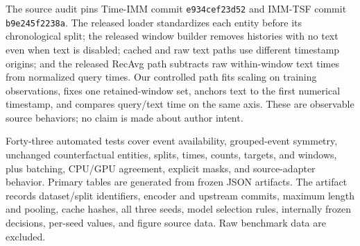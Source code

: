 The source audit pins Time-IMM commit \texttt{e934cef23d52} and IMM-TSF commit \texttt{b9e245f2238a}. The released loader standardizes each entity before its chronological split; the released window builder removes histories with no text even when text is disabled; cached and raw text paths use different timestamp origins; and the released RecAvg path subtracts raw within-window text times from normalized query times. Our controlled path fits scaling on training observations, fixes one retained-window set, anchors text to the first numerical timestamp, and compares query/text time on the same axis. These are observable source behaviors; no claim is made about author intent.

Forty-three automated tests cover event availability, grouped-event symmetry, unchanged counterfactual entities, splits, times, counts, targets, and windows, plus batching, CPU/GPU agreement, explicit masks, and source-adapter behavior. Primary tables are generated from frozen JSON artifacts. The artifact records dataset/split identifiers, encoder and upstream commits, maximum length and pooling, cache hashes, all three seeds, model selection rules, internally frozen decisions, per-seed values, and figure source data. Raw benchmark data are excluded.

